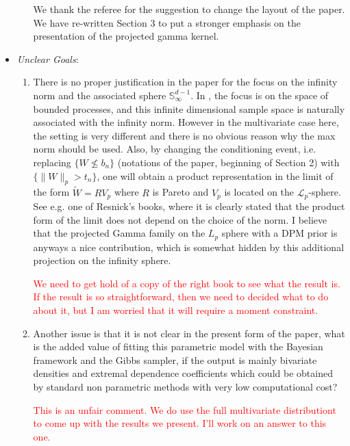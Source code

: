 \documentclass[10pt]{article}
\newcommand{\bruno}[1]{\textcolor{red}{#1}}
\begin{document}
\begin{itemize}
\begin{enumerate}
            We thank the referee for the suggestion to change the layout of the paper. We have
            re-written Section 3 to put a stronger emphasis on the presentation of the
            projected gamma kernel.
            
        \end{enumerate}

    \item \emph{Unclear Goals}: 
    \begin{enumerate}
        \item There is no proper justification in the paper for the focus on the infinity norm 
        and the associated sphere $\mathbb{S}_{\infty}^{d-1}$. In \cite{ferreira2014}, the focus
        is on the space of bounded processes, and this infinite dimensional sample space is 
        naturally associated with the infinity norm. However in the multivariate case here, the 
        setting is very different and there is no obvious reason why the max norm should be used. 
        Also, by changing the conditioning event, i.e. replacing $\lbrace W \not\leq b_{n}\rbrace$
        (notations of the paper, beginning of Section 2) with 
        $\lbrace \lVert W\rVert_p > t_n\rbrace$, one will obtain a product representation in the 
        limit of the form $\tilde{W} = RV_p$ where $R$ is Pareto and $V_p$ is located on the 
        $\mathcal{L}_p$-sphere. See e.g. one of Resnick’s books, where it is clearly stated that 
        the product form of the limit does not depend on the choice of the norm. I believe that 
        the projected Gamma family on the $L_p$ sphere with a DPM prior is anyways a nice 
        contribution, which is somewhat hidden by this additional projection on the infinity sphere.

        \bruno{We need to get hold of a copy of the right book to see what the result is. If the result 
        is so straightforward, then we need to decided what to do about it, but I am worried that
        it will require a moment constraint.}
        
        \item Another issue is that it is not clear in the present form of the paper, what is the
        added value of fitting this parametric model with the Bayesian framework and the Gibbs 
        sampler, if the output is mainly bivariate densities and extremal dependence coefficients 
        which could be obtained by standard non parametric methods with very low computational cost?

        \bruno{This is an unfair comment. We do use the full multivariate distributiont to come up
        with the results we present. I'll work on an answer to this one.}
    \end{enumerate}


\end{itemize}
\end{document}
